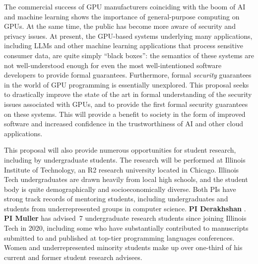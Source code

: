 \label{sec:impacts}

The commercial success of GPU manufacturers coinciding with the boom of
AI and machine learning shows the importance of general-purpose computing on
GPUs.
%
At the same time, the public has become more aware of security and privacy
issues.
%
At present, the GPU-based systems underlying many applications, including
LLMs and other machine learning applications that process sensitive consumer
data, are quite simply ``black boxes'': the semantics of these systems are
not well-understood enough for even the most well-intentioned software
developers to provide formal guarantees.
%
Furthermore, formal {\em security} guarantees in the world of GPU programming
is essentially unexplored.
%
This proposal seeks to drastically improve the state of the art in formal
understanding of the security issues associated with GPUs, and to provide
the first formal security guarantees on these systems.
%
This will provide a benefit to society in the form of improved software
and increased confidence in the trustworthiness of AI and other cloud
applications.

This proposal will also provide numerous opportunities for student research,
including by undergraduate students.
The research will be performed at Illinois Institute of Technology, an R2
research university located in Chicago.
%
Illinois Tech undergraduates are drawn heavily from local high schools, and
the student body is quite demographically and socioeconomically diverse.
%
Both PIs have strong track records of mentoring students, including
undergraduates and students from underrepresented groups in computer science.
\textbf{PI Derakhshan} .
%
\textbf{PI Muller} has advised~7 undergraduate research students since
joining Illinois Tech in 2020, including some who have substantially
contributed to manuscripts submitted to and published at top-tier
programming languages conferences.
%
Women and underrepresented minority students make up over one-third of his
current and former student research advisees.
